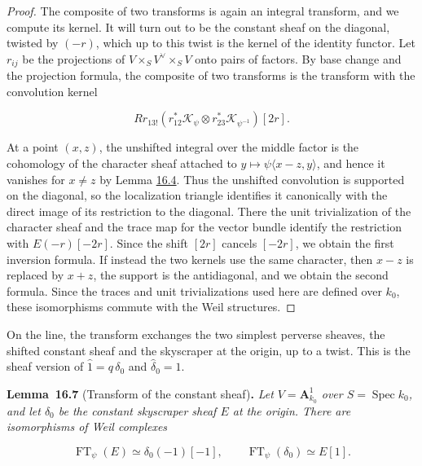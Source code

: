 \documentclass[11pt]{article}
\newenvironment{bpstatement}[2]{\par\addvspace{0.6\baselineskip}\noindent\textbf{#1}#2\textbf{.}\enspace\ignorespaces}
  {\par\addvspace{0.4\baselineskip}}
\newenvironment{bpstatementit}[2]{\begin{bpstatement}{#1}{#2}\itshape\ignorespaces}{\end{bpstatement}}
\begin{document}
\begin{proof}[{Proof}]\label{bp186}%
The composite of two transforms is again an integral transform, and we compute its kernel. It will turn out to be the constant sheaf on the diagonal, twisted by \((-r)\), which up to this twist is the kernel of the identity functor. Let \(r_{ij}\) be the projections of \(V\times_SV^\vee\times_SV\) onto pairs of factors. By base change and the projection formula, the composite of two transforms is the transform with the convolution kernel

\[
Rr_{13!}(r_{12}^*\mathcal K_\psi\otimes
r_{23}^*\mathcal K_{\psi^{-1}})[2r].
\]

At a point \((x,z)\), the unshifted integral over the middle factor is the cohomology of the character sheaf attached to \(y\mapsto\psi\langle x-z,y\rangle\), and hence it vanishes for \(x\ne z\) by Lemma \hyperref[bp179]{16.4}. Thus the unshifted convolution is supported on the diagonal, so the localization triangle identifies it canonically with the direct image of its restriction to the diagonal. There the unit trivialization of the character sheaf and the trace map for the vector bundle identify the restriction with \(E(-r)[-2r]\). Since the shift \([2r]\) cancels \([-2r]\), we obtain the first inversion formula. If instead the two kernels use the same character, then \(x-z\) is replaced by \(x+z\), the support is the antidiagonal, and we obtain the second formula. Since the traces and unit trivializations used here are defined over \(k_0\), these isomorphisms commute with the Weil structures.
\end{proof}

\label{bp187}%
On the line, the transform exchanges the two simplest perverse sheaves, the shifted constant sheaf and the skyscraper at the origin, up to a twist. This is the sheaf version of \(\hat 1=q\,\delta_0\) and \(\hat\delta_0=1\).

\label{bp188}%
\begin{bpstatementit}{Lemma~16.7}{ (Transform of the constant sheaf)}
Let \(V=\mathbf A^1_{k_0}\) over \(S=\operatorname{Spec}k_0\), and let \(\delta_0\) be the constant skyscraper sheaf \(E\) at the origin. There are isomorphisms of Weil complexes

\[
\operatorname{FT}_\psi(E)\simeq\delta_0(-1)[-1],
\qquad \operatorname{FT}_\psi(\delta_0)\simeq E[1].
\]
\end{bpstatementit}
\end{document}
